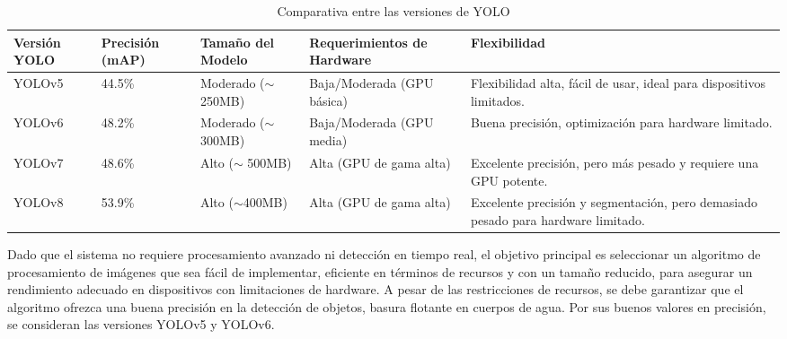 \begin{table}[H]
\centering
\renewcommand{\arraystretch}{1.5}
\caption{Comparativa entre las versiones de YOLO}
\label{tab:yolo_comparison1}
\begin{tabular}{|p{2cm}|p{2cm}|p{2cm}|p{3cm}|p{3cm}|}
\hline
\textbf{Versión YOLO} & \textbf{Precisión (mAP)} & \textbf{Tamaño del Modelo} & \textbf{Requerimientos de Hardware} & \textbf{Flexibilidad} \\ \hline
YOLOv5       & 44.5\%                  & Moderado ($\sim$ 250MB)          & Baja/Moderada (GPU básica)         & Flexibilidad alta, fácil de usar, ideal para dispositivos limitados. \\ \hline
YOLOv6       & 48.2\%                  & Moderado ($\sim$ 300MB)          & Baja/Moderada (GPU media)          & Buena precisión, optimización para hardware limitado. \\ \hline
YOLOv7       & 48.6\%                  & Alto ($\sim$ 500MB)              & Alta (GPU de gama alta)            & Excelente precisión, pero más pesado y requiere una GPU potente. \\ \hline
YOLOv8       & 53.9\%                  & Alto ($\sim$400MB)              & Alta (GPU de gama alta)            & Excelente precisión y segmentación, pero demasiado pesado para hardware limitado. \\ \hline
\end{tabular}
\end{table}

Dado que el sistema no requiere procesamiento avanzado ni detección en tiempo real, el objetivo principal es seleccionar un algoritmo de procesamiento de imágenes que sea fácil de implementar, eficiente en términos de recursos y con un tamaño reducido, para asegurar un rendimiento adecuado en dispositivos con limitaciones de hardware. A pesar de las restricciones de recursos, se debe garantizar que el algoritmo ofrezca una buena precisión en la detección de objetos, basura flotante en cuerpos de agua. Por sus buenos valores en precisión, se consideran las versiones YOLOv5 y YOLOv6.

